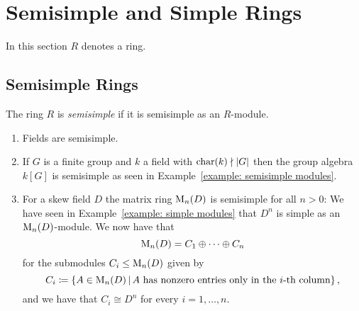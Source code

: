 \section{Semisimple and Simple Rings}


\begin{conventions}
  In this section $R$ denotes a ring.
\end{conventions}





\subsection{Semisimple Rings}


\begin{definition}
  The ring $R$ is \emph{semisimple} if it is semisimple as an $R$-module.
\end{definition}






\begin{example}
  \label{example: semisimple rings}
  \leavevmode
  \begin{enumerate}
    \item
      Fields are semisimple.
    \item
      If $G$ is a finite group and $k$ a field with $\operatorname{char}(k) \nmid |G|$ then the group algebra $k[G]$ is semisimple as seen in Example~\ref{example: semisimple modules}.
    \item
      For a skew field $D$ the matrix ring $\operatorname{M}_n(D)$ is semisimple for all $n > 0$:
      We have seen in Example~\ref{example: simple modules} that $D^n$ is simple as an $\operatorname{M}_n(D)$-module.
      We now have that
      \[
          \operatorname{M}_n(D)
        = C_1 \oplus \dotsb \oplus C_n
      \]
      for the submodules $C_i \leq \operatorname{M}_n(D)$ given by 
      \[
                  C_i
        \defined  \{
                    A \in \Mat_n(D)
                  \suchthat
                    \text{$A$ has nonzero entries only in the $i$-th column}
                  \} \,,
      \]
      and we have that $C_i \cong D^n$ for every $i = 1, \dotsc, n$.
  \end{enumerate}
\end{example}


